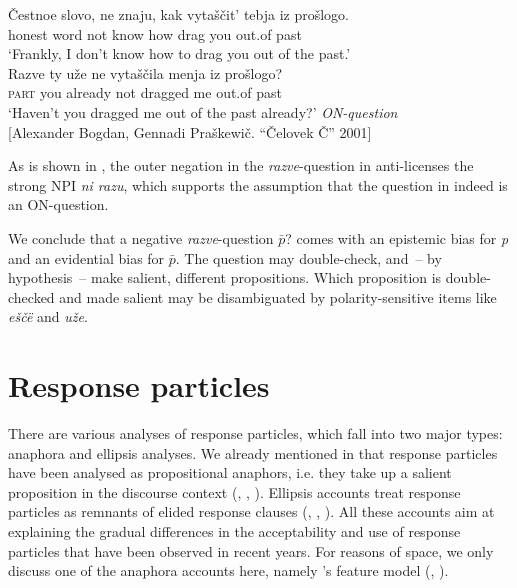 \documentclass[output=paper,colorlinks,citecolor=brown]{langscibook}
\begin{document}
\ea\label{geist-repp:ex:vytashitIzProshlogo}
\begin{xlist}[M:]
\gll Čestnoe	slovo,	ne	znaju,	kak	vytaščit’	tebja	iz	prošlogo.\\
honest	word	not	know	how	drag	you	out.of	past\\
\glt ‘Frankly, I don't know how to drag you out of the past.’\\
\gll Razve	ty	uže	ne	vytaščila	menja	iz	prošlogo?\\
\textsc{part}	you	already	not	dragged	me	out.of	past\\
\glt ‘Haven't you dragged me out of the past already?’  \hfill \textit{ON-question}\\
\hfill [Alexander Bogdan, Gennadi Praškewič. “Čelovek Č” 2001]
\end{xlist}
\z

\noindent As is shown in , the outer negation in the \textit{razve}-question in  anti-licenses the strong NPI \textit{ni razu}, which supports the assumption that the question in  indeed is an ON-question. 

\label{geist-repp:ex:*RazveTyUzeNiRazu}
\z

\noindent We conclude that a negative \textit{razve}-question $\bar{p}$? comes with an epistemic bias for \textit{p} and an evidential bias for $\bar{p}$. The question may double-check, and~-- by hypothesis~-- make salient, different propositions. Which proposition is double-checked and made salient may be disambiguated by polarity-sensitive items like \textit{eščë} and \textit{uže}. 

 

\section{Response particles}\label{geist-repp:sec:Response-particles}

There are various analyses of response particles, which fall into two major types: anaphora and ellipsis analyses. We already mentioned in  that response particles have been analysed as propositional anaphors, i.e. they take up a salient proposition in the discourse context (\citealt{Krifka2013}, \citealt{RoelofsenFarkas2015}, \citealt{FarkasRoelofsen2019}). Ellipsis accounts treat response particles as remnants of elided response clauses (\citealt{KramerRawlins2011}, \citealt{Holmberg2013}, \citeyear{Holmberg2015}). All these accounts aim at explaining the gradual differences in the acceptability and use of response particles that have been observed in recent years. For reasons of space, we only discuss one of the anaphora accounts here, namely \citeauthor{RoelofsenFarkas2015}’s feature model (\citealt{RoelofsenFarkas2015}, \citealt{FarkasRoelofsen2019}). 
\end{document}

